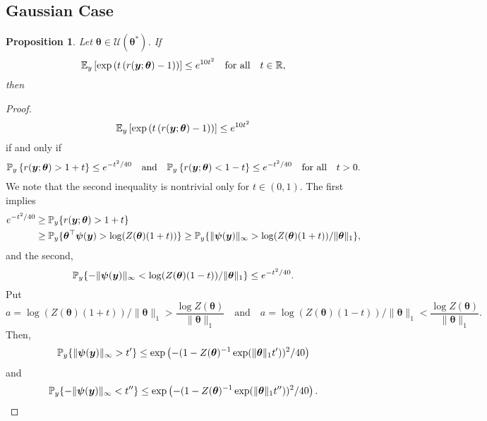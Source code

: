 \documentclass[11pt]{article}
\numberwithin{equation}{section}
\numberwithin{theorem}{section}
\def\faty{\boldsymbol{y}}
\def\fattheta{\boldsymbol{\theta}}
\def\fatpsi{\boldsymbol{\psi}}
\newtheorem{prop}[lem]{Proposition}
\theoremstyle{definition}
\theoremstyle{remark}
\begin{document}
\subsection{Gaussian Case} \label{sec:GGM}

\begin{prop}
Let $\fattheta \in \mathcal{U}(\fattheta^*)$.
If
\begin{equation}
\EE_y\left[ \exp\left( t \left( r(\faty;\fattheta) - 1 \right) \right) \right] \leq e^{10 t^2} \quad \text{for all} \quad t \in \RR,
\end{equation}
then
\end{prop}

\begin{proof}
\begin{equation}
\EE_y\left[ \exp\left( t \left( r(\faty;\fattheta) - 1 \right) \right) \right] \leq e^{10 t^2}
\end{equation}
if and only if
\begin{equation}
\PP_y\left\{ r(\faty;\fattheta) > 1+t \right\} \leq e^{-t^2 / 40}
\quad\text{and}\quad
\PP_y\left\{ r(\faty;\fattheta) < 1-t \right\} \leq e^{-t^2 / 40}
\quad\text{for all}\quad t > 0.
\end{equation}
We note that the second inequality is nontrivial only for $t \in (0,1)$.
The first implies
\begin{equation}
\begin{aligned}
e^{-t^2 / 40}
&\geq \PP_y\{ r(\faty;\fattheta) > 1+t \} \\
&\geq \PP_y\{ \fattheta^\top \fatpsi(\faty) > \log (Z(\fattheta)(1+t)) \}
\geq \PP_y\{ \|\fatpsi(\faty)\|_\infty > \log (Z(\fattheta)(1+t)) / \|\fattheta\|_1 \},
\end{aligned}
\end{equation}
and the second,
\begin{equation}
\PP_y\{ -\|\fatpsi(\faty)\|_\infty < \log (Z(\fattheta)(1-t)) / \|\fattheta\|_1 \}
\leq e^{-t^2 / 40}.
\end{equation}
Put
\begin{equation}
a = \log(Z(\fattheta)(1+t)) / \|\fattheta\|_1 > \frac{\log Z(\fattheta)}{\|\fattheta\|_1}
\quad\text{and}\quad
a = \log(Z(\fattheta)(1-t)) / \|\fattheta\|_1 < \frac{\log Z(\fattheta)}{\|\fattheta\|_1}.
\end{equation}
Then,
\begin{equation}
\PP_y\{ \|\fatpsi(\faty)\|_\infty > t' \}
\leq \exp\left( -(1 - Z(\fattheta)^{-1} \exp(\|\fattheta\|_1 t'))^2 / 40 \right)
\end{equation}
and
\begin{equation}
\PP_y\{ -\|\fatpsi(\faty)\|_\infty < t'' \}
\leq \exp\left( -(1-Z(\fattheta)^{-1} \exp(\|\fattheta\|_1 t''))^2 / 40 \right).
\end{equation}

\end{proof}
\end{document}
